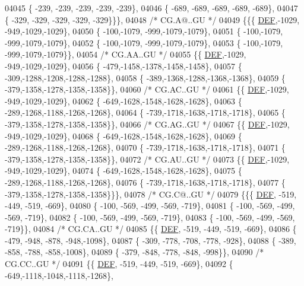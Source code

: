 \begin{DoxyCode}
04045 \{ -239, -239, -239, -239, -239\},
04046 \{ -689, -689, -689, -689, -689\},
04047 \{ -329, -329, -329, -329, -329\}\}\},
04048 \textcolor{comment}{/* CG.A@..GU */}
04049 \{\{\{  \mbox{\hyperlink{1_88_84__epars_8h_a397419fc12b37ed479c8abb9d444d843}{DEF}},-1029, -949,-1029,-1029\},
04050 \{ -100,-1079, -999,-1079,-1079\},
04051 \{ -100,-1079, -999,-1079,-1079\},
04052 \{ -100,-1079, -999,-1079,-1079\},
04053 \{ -100,-1079, -999,-1079,-1079\}\},
04054 \textcolor{comment}{/* CG.AA..GU */}
04055 \{\{  \mbox{\hyperlink{1_88_84__epars_8h_a397419fc12b37ed479c8abb9d444d843}{DEF}},-1029, -949,-1029,-1029\},
04056 \{ -479,-1458,-1378,-1458,-1458\},
04057 \{ -309,-1288,-1208,-1288,-1288\},
04058 \{ -389,-1368,-1288,-1368,-1368\},
04059 \{ -379,-1358,-1278,-1358,-1358\}\},
04060 \textcolor{comment}{/* CG.AC..GU */}
04061 \{\{  \mbox{\hyperlink{1_88_84__epars_8h_a397419fc12b37ed479c8abb9d444d843}{DEF}},-1029, -949,-1029,-1029\},
04062 \{ -649,-1628,-1548,-1628,-1628\},
04063 \{ -289,-1268,-1188,-1268,-1268\},
04064 \{ -739,-1718,-1638,-1718,-1718\},
04065 \{ -379,-1358,-1278,-1358,-1358\}\},
04066 \textcolor{comment}{/* CG.AG..GU */}
04067 \{\{  \mbox{\hyperlink{1_88_84__epars_8h_a397419fc12b37ed479c8abb9d444d843}{DEF}},-1029, -949,-1029,-1029\},
04068 \{ -649,-1628,-1548,-1628,-1628\},
04069 \{ -289,-1268,-1188,-1268,-1268\},
04070 \{ -739,-1718,-1638,-1718,-1718\},
04071 \{ -379,-1358,-1278,-1358,-1358\}\},
04072 \textcolor{comment}{/* CG.AU..GU */}
04073 \{\{  \mbox{\hyperlink{1_88_84__epars_8h_a397419fc12b37ed479c8abb9d444d843}{DEF}},-1029, -949,-1029,-1029\},
04074 \{ -649,-1628,-1548,-1628,-1628\},
04075 \{ -289,-1268,-1188,-1268,-1268\},
04076 \{ -739,-1718,-1638,-1718,-1718\},
04077 \{ -379,-1358,-1278,-1358,-1358\}\}\},
04078 \textcolor{comment}{/* CG.C@..GU */}
04079 \{\{\{  \mbox{\hyperlink{1_88_84__epars_8h_a397419fc12b37ed479c8abb9d444d843}{DEF}}, -519, -449, -519, -669\},
04080 \{ -100, -569, -499, -569, -719\},
04081 \{ -100, -569, -499, -569, -719\},
04082 \{ -100, -569, -499, -569, -719\},
04083 \{ -100, -569, -499, -569, -719\}\},
04084 \textcolor{comment}{/* CG.CA..GU */}
04085 \{\{  \mbox{\hyperlink{1_88_84__epars_8h_a397419fc12b37ed479c8abb9d444d843}{DEF}}, -519, -449, -519, -669\},
04086 \{ -479, -948, -878, -948,-1098\},
04087 \{ -309, -778, -708, -778, -928\},
04088 \{ -389, -858, -788, -858,-1008\},
04089 \{ -379, -848, -778, -848, -998\}\},
04090 \textcolor{comment}{/* CG.CC..GU */}
04091 \{\{  \mbox{\hyperlink{1_88_84__epars_8h_a397419fc12b37ed479c8abb9d444d843}{DEF}}, -519, -449, -519, -669\},
04092 \{ -649,-1118,-1048,-1118,-1268\},

\end{DoxyCode}
